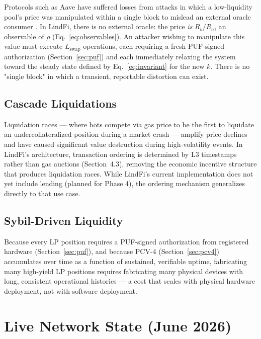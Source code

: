 \documentclass[11pt,a4paper]{article}
\begin{document}
Protocols such as Aave have suffered losses from attacks in which a low-liquidity pool's price was manipulated within a single block to mislead an external oracle consumer \cite{aave_incident}. In LindFi, there is no external oracle: the price \emph{is} $R_b/R_a$, an observable of $\rho$ (Eq.~\ref{eq:observables}). An attacker wishing to manipulate this value must execute $L_{\text{swap}}$ operations, each requiring a fresh PUF-signed authorization (Section~\ref{sec:puf}) and each immediately relaxing the system toward the steady state defined by Eq.~\eqref{eq:invariant} for the new $k$. There is no "single block" in which a transient, reportable distortion can exist.

\subsection{Cascade Liquidations}

Liquidation races --- where bots compete via gas price to be the first to liquidate an undercollateralized position during a market crash --- amplify price declines and have caused significant value destruction during high-volatility events. In LindFi's architecture, transaction ordering is determined by L3 timestamps rather than gas auctions (Section~4.3), removing the economic incentive structure that produces liquidation races. While LindFi's current implementation does not yet include lending (planned for Phase 4), the ordering mechanism generalizes directly to that use case.

\subsection{Sybil-Driven Liquidity}

Because every LP position requires a PUF-signed authorization from registered hardware (Section~\ref{sec:puf}), and because PCV-4 (Section~\ref{sec:pcv4}) accumulates over time as a function of sustained, verifiable uptime, fabricating many high-yield LP positions requires fabricating many physical devices with long, consistent operational histories --- a cost that scales with physical hardware deployment, not with software deployment.

\section{Live Network State (June 2026)}
\end{document}
